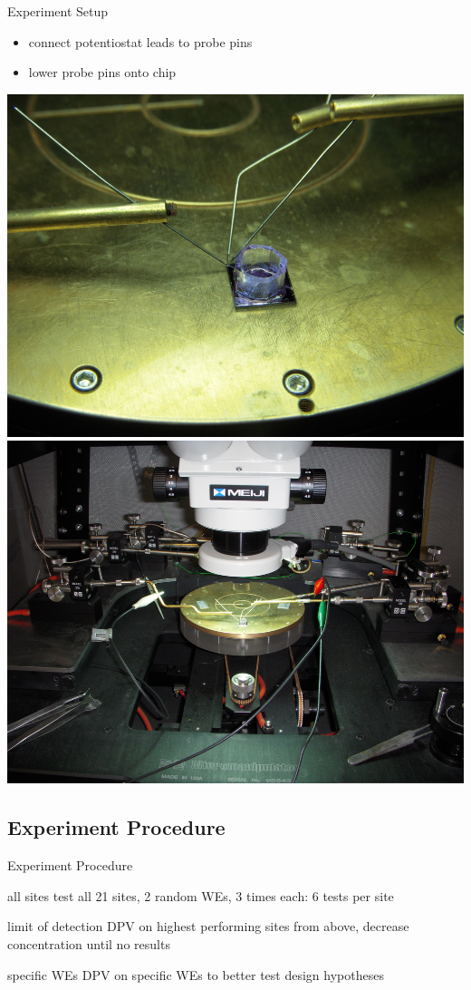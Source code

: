 \documentclass[10pt]{beamer}
\begin{document}
\begin{frame}{Experiment Setup}
	\begin{itemize}
		\item connect potentiostat leads to probe pins
		\item lower probe pins onto chip
	\end{itemize}
	\includegraphics[width=0.5\linewidth]{figures/chippins.png}
	\includegraphics[width=0.5\linewidth]{figures/potentiostatleads.png}
\end{frame}

\subsection{Experiment Procedure}
\begin{frame}{Experiment Procedure}
	\begin{block}{all sites}
		test all 21 sites, 2 random WEs, 3 times each: 6 tests per site
	\end{block}
	\begin{block}{limit of detection}
		DPV on highest performing sites from above, decrease concentration until no results
	\end{block}
	\begin{block}{specific WEs}
		DPV on specific WEs to better test design hypotheses
	\end{block}
\end{frame}
\end{document}
